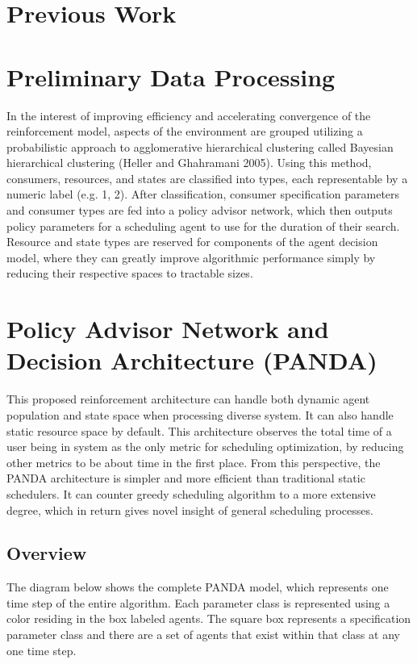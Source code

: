 \documentclass{article}
\theoremstyle{definition}
\theoremstyle{remark}
\begin{document}
	\section{Previous Work}
	
	\section{Preliminary Data Processing}
	
	In the interest of improving efficiency and accelerating convergence of the reinforcement model, aspects of the environment are grouped utilizing a probabilistic approach to agglomerative hierarchical clustering called Bayesian hierarchical clustering (Heller and Ghahramani 2005). Using this method, consumers, resources, and states are classified into types, each representable by a numeric label (e.g. 1, 2). After classification, consumer specification parameters and consumer types are fed into a policy advisor network, which then outputs policy parameters for a scheduling agent to use for the duration of their search. Resource and state types are reserved for components of the agent decision model, where they can greatly improve algorithmic performance simply by reducing their respective spaces to tractable sizes.

	\section{Policy Advisor Network and Decision Architecture (PANDA)}

	This proposed reinforcement architecture can handle both dynamic agent population and state space when processing diverse system. It can also handle static resource space by default. This architecture observes the total time of a user being in system as the only metric for scheduling optimization, by reducing other metrics to be about time in the first place. From this perspective, the PANDA architecture is simpler and more efficient than traditional static schedulers. It can counter greedy scheduling algorithm to a more extensive degree, which in return gives novel insight of general scheduling processes.

		\subsection{Overview}

		The diagram below shows the complete PANDA model, which represents one time step of the entire algorithm. Each parameter class is represented using a color residing in the box labeled agents. The square box represents a specification parameter class and there are a set of agents that exist within that class at any one time step.
\end{document}
